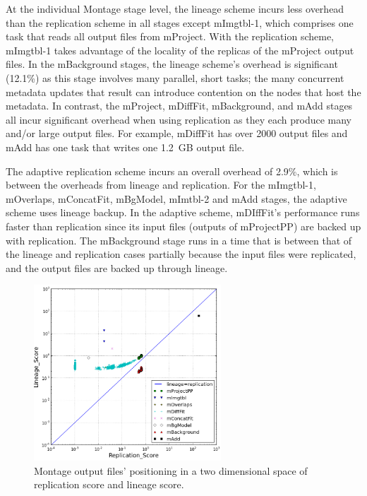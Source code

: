 \documentclass{sig-alternate}
\begin{document}
At the individual Montage stage level, the lineage scheme incurs less overhead than the replication scheme in all stages except mImgtbl-1,
which comprises one task that reads all output files from mProject.
With the replication scheme, mImgtbl-1 takes advantage of the locality of the replicas of the mProject output files.
In the mBackground stages, the lineage scheme's overhead is significant (12.1\%) as this stage involves many
parallel, short tasks; the many concurrent metadata updates that result can introduce contention on the nodes that host the metadata.
In contrast, the mProject, mDiffFit, mBackground, and mAdd stages all incur significant overhead when using replication as they each produce many and/or large output files.
For example, mDiffFit has over 2000 output files and mAdd has one task that writes one 1.2~GB output file.

The adaptive replication scheme incurs an overall overhead of 2.9\%, which is between the overheads from lineage and replication.
For the mImgtbl-1, mOverlaps, mConcatFit, mBgModel, mImtbl-2 and mAdd stages, the adaptive
scheme uses lineage backup.
In the adaptive scheme, mDIffFit's performance runs faster than replication since its input files (outputs of mProjectPP) are backed up with replication.
The mBackground stage runs in a time that is between that of the lineage and replication cases partially because the input files
were replicated, and the output files are backed up through lineage.


\begin{figure}[ht]
        \begin{center}
                \includegraphics[width=70mm]{pictures/dist}
                \vspace{-10pt}
                \caption{Montage output files' positioning in a two dimensional space of replication score and lineage score.
                \label{fig:montage-space}}
        \end{center}
\end{figure}
\end{document}
